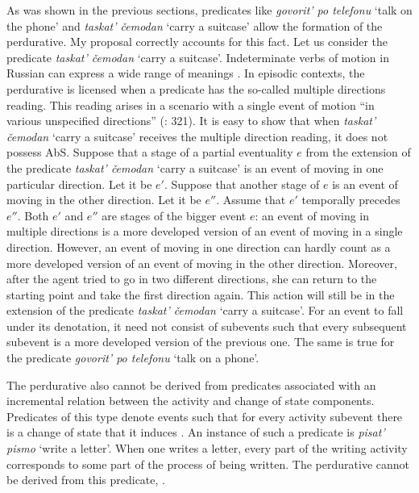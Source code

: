 \documentclass[output=paper,
]{langscibook}
\begin{document}
As was shown in the previous sections, predicates like \textit{govorit’ po telefonu} `talk on the phone' and \textit{taskat’ čemodan} `carry a suitcase' allow the formation of the perdurative. My proposal correctly accounts for this fact. Let us consider the predicate \textit{taskat’ čemodan} `carry a suitcase'. Indeterminate verbs of motion in Russian can express a wide range of meanings \citep{forsyth1970grammar}. In episodic contexts, the perdurative is licensed when a predicate has the so-called multiple directions reading. This reading arises in a scenario with a single event of motion ``in various unspecified directions'' (\citealt{forsyth1970grammar}: 321). It is easy to show that when \textit{taskat’ čemodan} `carry a suitcase' receives the multiple direction reading, it does not possess AbS. Suppose that a stage of a partial eventuality $e$ from the extension of the predicate \textit{taskat’ čemodan} `carry a suitcase' is an event of moving in one particular direction. Let it be $e'$. Suppose that another stage of $e$ is an event of moving in the other direction. Let it be $e''$. Assume that $e'$ temporally precedes $e''$. Both $e'$ and $e''$ are stages of the bigger event $e$: an event of moving in multiple directions is a more developed version of an event of moving in a single direction. However, an event of moving in one direction can hardly count as a more developed version of an event of moving in the other direction. Moreover, after the agent tried to go in two different directions, she can return to the starting point and take the first direction again. This action will still be in the extension of the predicate \textit{taskat’ čemodan} `carry a suitcase'. For an event to fall under its denotation, it need not consist of subevents such that every subsequent subevent is a more developed version of the previous one. The same is true for the predicate \textit{govorit’ po telefonu} `talk on a phone'. 

The perdurative also cannot be derived from predicates associated with an incremental relation between the activity and change of state components. Predicates of this type denote events such that for every activity subevent there is a change of state that it induces \citep{rothstein2004structuring}. An instance of such a predicate is \textit{pisat’ pismo} `write a letter'. When one writes a letter, every part of the writing activity corresponds to some part of the process of being written. The perdurative cannot be derived from this predicate, .
\end{document}
